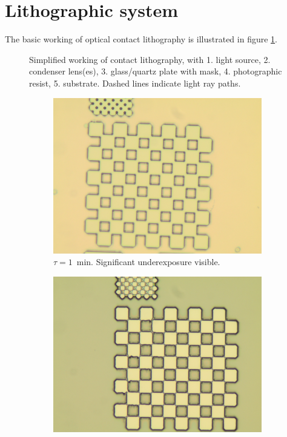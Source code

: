 \section*{Lithographic system}
The basic working of optical contact lithography is illustrated in figure \ref{fig:contact-litho}.
\begin{figure}[H]
	\centering
	\resizebox{0.7\linewidth}{!}{}
	\caption{Simplified working of contact lithography, with 1. light source, 2. condenser lens(es), 3. glass/quartz plate with mask, 4. photographic resist, 5. substrate. Dashed lines indicate light ray paths.}
	\label{fig:contact-litho}
\end{figure}
            \begin{figure}[!b]
                \centering
                \begin{subfigure}[t]{0.3\linewidth}
                    \centering
                    \includegraphics[width=\textwidth]{data/b3d1.jpg}
                    \caption{$\tau = 1$~min. Significant underexposure visible.}
                    \label{fig:b3d1}
                \end{subfigure}
                \hfill
                \begin{subfigure}[t]{0.3\linewidth}
                    \centering
                    \includegraphics[width=\textwidth]{data/b3e1.jpg}

\end{subfigure}
\end{figure}
